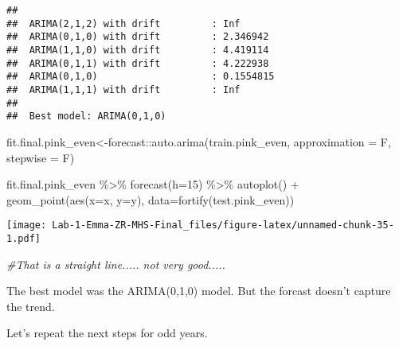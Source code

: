 \documentclass[
]{article}
\newenvironment{Shaded}{\begin{snugshade}}{\end{snugshade}}
\newcommand{\AttributeTok}[1]{\textcolor[rgb]{0.77,0.63,0.00}{#1}}
\newcommand{\CommentTok}[1]{\textcolor[rgb]{0.56,0.35,0.01}{\textit{#1}}}
\newcommand{\DecValTok}[1]{\textcolor[rgb]{0.00,0.00,0.81}{#1}}
\newcommand{\FloatTok}[1]{\textcolor[rgb]{0.00,0.00,0.81}{#1}}
\newcommand{\FunctionTok}[1]{\textcolor[rgb]{0.00,0.00,0.00}{#1}}
\newcommand{\NormalTok}[1]{#1}
\newcommand{\OtherTok}[1]{\textcolor[rgb]{0.56,0.35,0.01}{#1}}
\newcommand{\SpecialCharTok}[1]{\textcolor[rgb]{0.00,0.00,0.00}{#1}}
\begin{document}
\begin{verbatim}
## 
##  ARIMA(2,1,2) with drift         : Inf
##  ARIMA(0,1,0) with drift         : 2.346942
##  ARIMA(1,1,0) with drift         : 4.419114
##  ARIMA(0,1,1) with drift         : 4.222938
##  ARIMA(0,1,0)                    : 0.1554815
##  ARIMA(1,1,1) with drift         : Inf
## 
##  Best model: ARIMA(0,1,0)
\end{verbatim}

\begin{Shaded}
\begin{Highlighting}[]
\NormalTok{fit.final.pink\_even}\OtherTok{\textless{}{-}}\NormalTok{forecast}\SpecialCharTok{::}\FunctionTok{auto.arima}\NormalTok{(train.pink\_even, }\AttributeTok{approximation =}\NormalTok{ F, }\AttributeTok{stepwise =}\NormalTok{ F)}

\NormalTok{fit.final.pink\_even }\SpecialCharTok{\%\textgreater{}\%}
  \FunctionTok{forecast}\NormalTok{(}\AttributeTok{h=}\DecValTok{15}\NormalTok{) }\SpecialCharTok{\%\textgreater{}\%}
  \FunctionTok{autoplot}\NormalTok{() }\SpecialCharTok{+} \FunctionTok{geom\_point}\NormalTok{(}\FunctionTok{aes}\NormalTok{(}\AttributeTok{x=}\NormalTok{x, }\AttributeTok{y=}\NormalTok{y), }\AttributeTok{data=}\FunctionTok{fortify}\NormalTok{(test.pink\_even))}
\end{Highlighting}
\end{Shaded}

\texttt{[image: Lab-1-Emma-ZR-MHS-Final\_files/figure-latex/unnamed-chunk-35-1.pdf]}

\begin{Shaded}
\begin{Highlighting}[]
\CommentTok{\#That is a straight line..... not very good.....}
\end{Highlighting}
\end{Shaded}

The best model was the ARIMA(0,1,0) model. But the forcast doesn't
capture the trend.

Let's repeat the next steps for odd years.

\begin{Shaded}
\end{Shaded}
\end{document}
